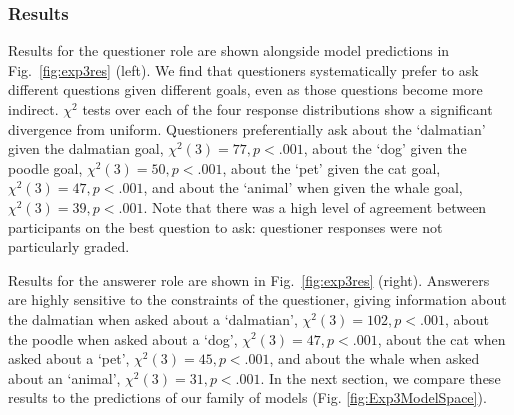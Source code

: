 \documentclass[12pt, floatsintext, jou]{apa6}
\begin{document}
\subsubsection{Results}
Results for the questioner role are shown alongside model predictions in Fig.~\ref{fig:exp3res} (left). We find that questioners systematically prefer to ask different questions given different goals, even as those questions become more indirect. $\chi^2$ tests over each of the four response distributions show a significant divergence from uniform. Questioners preferentially ask about the `dalmatian' given the  dalmatian goal, ${\chi^2(3) = 77}, {p < .001}$, about the `dog' given the poodle goal, ${\chi^2(3) = 50}, {p <.001}$, about the `pet' given the cat goal, ${\chi^2(3) = 47},  {p <.001}$, and about the `animal' when given the whale goal, ${\chi^2(3) = 39}, {p <.001}$. Note that there was a high level of agreement between participants on the best question to ask: questioner responses were not particularly graded.

Results for the answerer role are shown in Fig.~\ref{fig:exp3res} (right). Answerers are highly sensitive to the constraints of the questioner, giving information about the dalmatian when asked about a `dalmatian', ${\chi^2(3) = 102}, {p <.001}$, about the poodle when asked about a `dog', ${\chi^2(3) = 47}, {p <.001}$, about the cat when asked about a `pet', ${\chi^2(3) = 45}, {p<.001}$, and about the whale when asked about an `animal', ${\chi^2(3) = 31}, {p < .001}$. In the next section, we compare these results to the predictions of our family of models (Fig. \ref{fig:Exp3ModelSpace}). 
\end{document}
